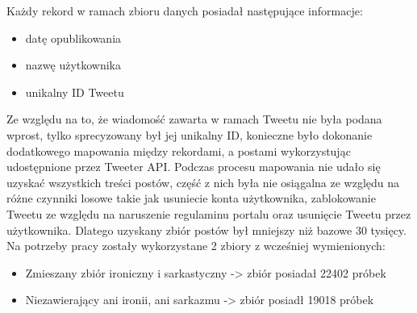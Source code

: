 Każdy rekord w ramach zbioru danych posiadał następujące informacje:
\begin{itemize}
    \item datę opublikowania
    \item nazwę użytkownika
    \item unikalny ID Tweetu
\end{itemize}




Ze względu na to, że wiadomość zawarta w ramach Tweetu nie była podana wprost, tylko sprecyzowany był jej unikalny ID, konieczne było dokonanie dodatkowego mapowania między rekordami, a postami wykorzystując udostępnione przez Tweeter API. Podczas procesu mapowania nie udało się uzyskać wszystkich treści postów, część z nich była nie osiągalna ze względu na różne czynniki losowe takie jak usuniecie konta użytkownika, zablokowanie Tweetu ze względu na naruszenie regulaminu portalu oraz usunięcie Tweetu przez użytkownika. Dlatego uzyskany zbiór postów był mniejszy niż bazowe 30 tysięcy.  
Na potrzeby pracy zostały wykorzystane 2 zbiory z wcześniej wymienionych:
\begin{itemize}
    \item Zmieszany zbiór ironiczny i sarkastyczny -> zbiór posiadał 22402 próbek
    \item Niezawierający ani ironii, ani sarkazmu -> zbiór posiadł 19018 próbek
\end{itemize}



